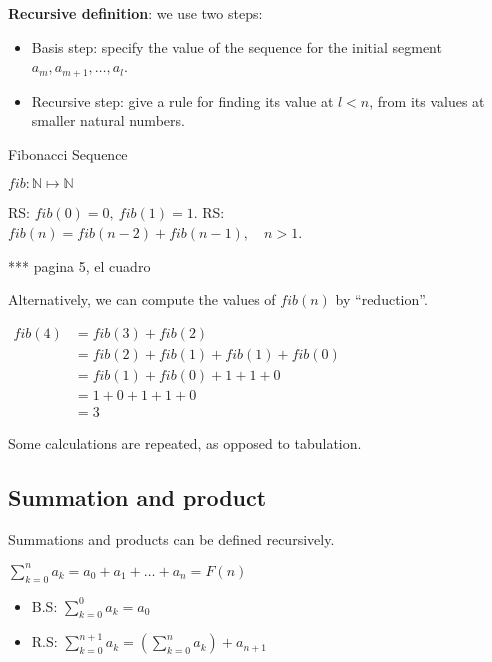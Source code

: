 \documentclass[12pt, a4paper]{book}
\begin{document}
\begin{defn}
    \textbf{Recursive definition}: we use two steps:
    \begin{itemize}
        \item Basis step: specify the value of the sequence for the initial segment $a_m,a_{m+1},\ldots,a_l$.
        \item Recursive step: give a rule for finding its value at $l<n$, from its values at smaller natural numbers.
    \end{itemize}
\end{defn}

\begin{exmp}
    Fibonacci Sequence

    $fib: \mathbb{N} \mapsto \mathbb{N}$
    
    RS: $fib(0) = 0,\ fib(1) = 1 $.\newline 
    RS: $fib(n) = fib(n-2) + fib(n-1),\quad n>1$.

    *** pagina 5, el cuadro

    Alternatively, we can compute the values of $fib(n)$ by ``reduction''.

    $
    \begin{aligned}
        fib(4) &= fib(3) + fib(2) \\
        &= fib(2) + fib(1) + fib(1) + fib(0) \\
        &= fib(1) + fib(0) + 1 + 1 + 0 \\
        &= 1 + 0 + 1 + 1+ 0 \\
        &= 3
    \end{aligned}
    $

    Some calculations are repeated, as opposed to tabulation.
\end{exmp}

\subsection{Summation and product}

Summations and products can be defined recursively.

$\sum_{k = 0}^{n} a_k = a_0 + a_1 + \ldots + a_n = F(n)$

\begin{itemize}
    \item B.S: $\sum_{k = 0}^0 a_k = a_0$
    \item R.S: $\sum_{k = 0}^{n+1} a_k = (\sum_{k = 0}^n a_k) + a_{n+1}$
\end{itemize}
\end{document}
